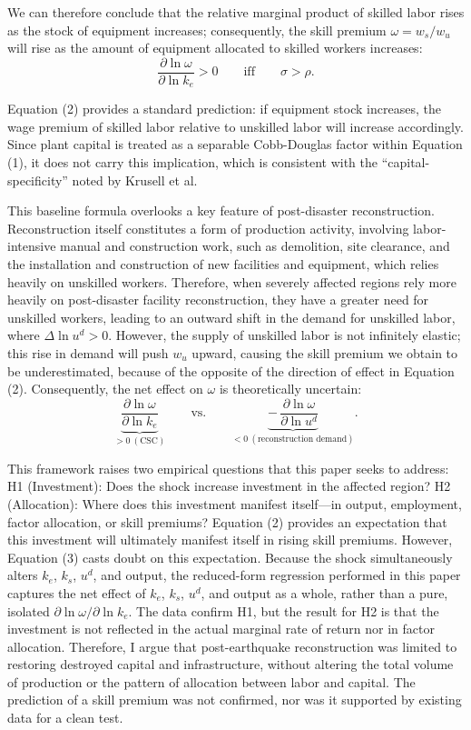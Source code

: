 \documentclass[12pt]{article}
\begin{document}
We can therefore conclude that the relative marginal product of skilled labor rises as the stock of
equipment increases; consequently, the skill premium $\omega = w_s/w_u$ will rise as the amount of
equipment allocated to skilled workers increases:
\begin{equation}
\frac{\partial \ln\omega}{\partial \ln k_e}>0 \qquad\text{iff}\qquad \sigma>\rho.
\end{equation}

Equation (2) provides a standard prediction: if equipment stock increases, the wage premium of
skilled labor relative to unskilled labor will increase accordingly. Since plant capital is treated
as a separable Cobb-Douglas factor within Equation (1), it does not carry this implication, which
is consistent with the ``capital-specificity'' noted by Krusell et al.

This baseline formula overlooks a key feature of post-disaster reconstruction. Reconstruction itself
constitutes a form of production activity, involving labor-intensive manual and construction work,
such as demolition, site clearance, and the installation and construction of new facilities and
equipment, which relies heavily on unskilled workers. Therefore, when severely affected regions
rely more heavily on post-disaster facility reconstruction, they have a greater need for unskilled
workers, leading to an outward shift in the demand for unskilled labor, where $\Delta\ln u^{d} > 0$.
However, the supply of unskilled labor is not infinitely elastic; this rise in demand will push
$w_u$ upward, causing the skill premium we obtain to be underestimated, because of the opposite of
the direction of effect in Equation (2). Consequently, the net effect on $\omega$ is theoretically
uncertain:
\begin{equation}
\underbrace{\frac{\partial \ln\omega}{\partial \ln k_e}}_{>0\ (\text{CSC})}\qquad\text{vs.}\qquad
\underbrace{-\,\frac{\partial \ln\omega}{\partial \ln u^{d}}}_{<0\ (\text{reconstruction demand})}.
\end{equation}

This framework raises two empirical questions that this paper seeks to address: H1 (Investment):
Does the shock increase investment in the affected region? H2 (Allocation): Where does this
investment manifest itself---in output, employment, factor allocation, or skill premiums? Equation
(2) provides an expectation that this investment will ultimately manifest itself in rising skill
premiums. However, Equation (3) casts doubt on this expectation. Because the shock simultaneously
alters $k_e$, $k_s$, $u^{d}$, and output, the reduced-form regression performed in this paper
captures the net effect of $k_e$, $k_s$, $u^{d}$, and output as a whole, rather than a pure,
isolated $\partial\ln\omega/\partial\ln k_e$. The data confirm H1, but the result for H2 is that
the investment is not reflected in the actual marginal rate of return nor in factor allocation.
Therefore, I argue that post-earthquake reconstruction was limited to restoring destroyed capital
and infrastructure, without altering the total volume of production or the pattern of allocation
between labor and capital. The prediction of a skill premium was not confirmed, nor was it supported
by existing data for a clean test.
\end{document}
